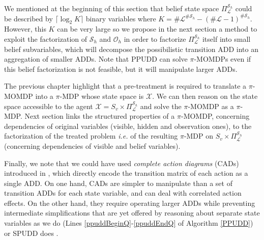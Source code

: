 We mentioned at the beginning of this section 
that belief state space $\Pi^{\mathcal{S}_h}_{\mathcal{L}}$
could be described by $\lceil \log_2 K \rceil$ binary variables where $K=\#
\mathcal{L}^{\#\mathcal{S}_h} - (\# \mathcal{L}-1)^{\# \mathcal{S}_h}$. 
However, this $K$ can be
very large so we propose 
in the next section a method to exploit the
factorization of $\mathcal{S}_h$ and $\mathcal{O}_h$ 
in order to factorize $\Pi^{\mathcal{S}_h}_{\mathcal{L}}$
itself into small belief subvariables, which will decompose the possibilistic
transition ADD into an aggregation of smaller ADDs.
Note that PPUDD can solve $\pi$-MOMDPs even if this belief factorization is not 
feasible, but it will manipulate larger ADDs.

The previous chapter highlight that 
a pre-treatment is required to translate
a $\pi$-MOMDP into a $\pi$-MDP whose state space is $\mathcal{X}$.
We can then reason on the state space accessible to the agent 
$\mathcal{X} = S_v \times \Pi^{\mathcal{S}_h}_{\mathcal{L}}$ and
solve the $\pi$-MOMDP as a $\pi$-MDP.
Next section links the structured properties of a $\pi$-MOMDP,
concerning dependencies of original variables (visible, hidden and observation ones), 
to the factorization of the treated problem \textit{i.e.} of the resulting $\pi$-MDP 
on $S_v \times \Pi^{\mathcal{S}_h}_{\mathcal{L}}$ (concerning dependencies of visible and belief variables).

Finally, we note that we could have used \emph{complete action diagrams} (CADs)
introduced in \cite{St-aubin00apricodd:approximate}, 
which directly encode the
transition matrix of each action as a single ADD.
On one hand, CADs are simpler
to manipulate than a set of transition ADDs for each state variable, 
and can deal with correlated action effects. On the other hand,
they require operating larger ADDs while preventing intermediate simplifications that are yet
offered by reasoning about separate state variables as we do (Lines
\ref{ppuddBeginQ}-\ref{ppuddEndQ} of Algorithm \ref{PPUDD}) or SPUDD does
\cite{Hoey99spudd:stochastic}.


